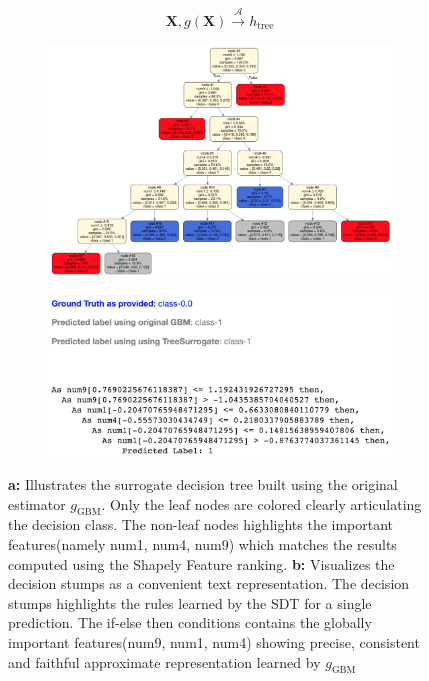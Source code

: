 \documentclass{article}
\begin{document}
\begin{equation}
\mathbf{X}, g(\mathbf{X}) \xrightarrow{\mathcal{A}} h_{\text{tree}}
\end{equation}

\begin{figure}[H]
	\begin{subfigure}[tb]{.5\textwidth}
		\begin{center}
			\includegraphics[width=\linewidth]{img/sdt_visualization}
			\caption{}
			\label{fig:surrogate_dt}
		\end{center}
	\end{subfigure}%
	\begin{subfigure}[tb]{.5\textwidth}
		\begin{center}
			\includegraphics[width=1.3\linewidth]{img/decision_stumps_txt}
			\caption{}
			\label{fig:surrogate_dt}
		\end{center}
	\end{subfigure}%
	\captionsetup{font=footnotesize}
	\caption{\textbf{a:} Illustrates the surrogate decision tree built using the original estimator $g_{\text{GBM}}$. Only the leaf nodes are colored clearly articulating the decision class. The non-leaf nodes highlights the important features(namely num1, num4, 
	num9) which matches the results computed using the Shapely Feature ranking. \textbf{b:} Visualizes the decision stumps as a convenient text representation. The decision stumps highlights the rules learned by the SDT for a single prediction. The if-else then
	conditions contains the globally important features(num9, num1, num4) showing precise, consistent and faithful approximate representation learned by $g_{\text{GBM}}$}
\end{figure}
\end{document}
